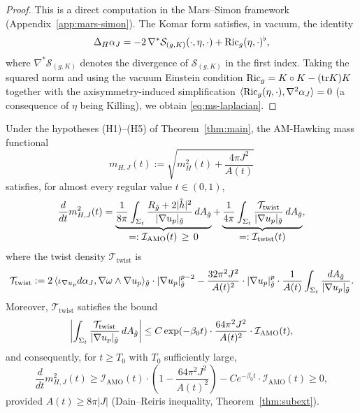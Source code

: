 \begin{proof}
This is a direct computation in the Mars--Simon framework (Appendix~\ref{app:mars-simon}). The Komar form satisfies, in vacuum, the identity
\begin{equation}
\Delta_H \alpha_J = -2\,\nabla^* \mathcal{S}_{(g,K)}(\cdot, \eta, \cdot) + \mathrm{Ric}_g(\eta, \cdot)^\flat,
\end{equation}
where $\nabla^* \mathcal{S}_{(g,K)}$ denotes the divergence of $\mathcal{S}_{(g,K)}$ in the first index. Taking the squared norm and using the vacuum Einstein condition $\mathrm{Ric}_g = K \circ K - (\mathrm{tr} K) K$ together with the axisymmetry-induced simplification $\langle \mathrm{Ric}_g(\eta, \cdot), \nabla^2 \alpha_J\rangle = 0$ (a consequence of $\eta$ being Killing), we obtain \eqref{eq:ms-laplacian}.
\end{proof}

\begin{theorem}\label{thm:tbm-main}
Under the hypotheses (H1)--(H5) of Theorem~\ref{thm:main}, the AM-Hawking mass functional
\begin{equation}
m_{H,J}(t) := \sqrt{m_H^2(t) + \frac{4\pi J^2}{A(t)}}
\end{equation}
satisfies, for almost every regular value $t \in (0, 1)$,
\begin{equation}\label{eq:tbm-formula}
\frac{d}{dt} m_{H,J}^2(t) = \underbrace{\frac{1}{8\pi}\int_{\Sigma_t} \frac{R_{\tilde{g}} + 2|\mathring{h}|^2}{|\nabla u_p|_{\tilde{g}}} \, dA_{\tilde{g}}}_{\displaystyle =: \mathcal{I}_{\mathrm{AMO}}(t) \,\geq\, 0} + \underbrace{\frac{1}{4\pi}\int_{\Sigma_t} \frac{\mathcal{T}_{\mathrm{twist}}}{|\nabla u_p|_{\tilde{g}}} \, dA_{\tilde{g}}}_{\displaystyle =: \mathcal{I}_{\mathrm{twist}}(t)},
\end{equation}
where the twist density $\mathcal{T}_{\mathrm{twist}}$ is
\begin{equation}
\mathcal{T}_{\mathrm{twist}} := 2\,\langle \iota_{\nabla u_p} d\alpha_J, \nabla \omega \wedge \nabla u_p \rangle_{\tilde{g}} \cdot |\nabla u_p|_{\tilde{g}}^{p-2} - \frac{32\pi^2 J^2}{A(t)^2} \cdot |\nabla u_p|_{\tilde{g}}^{p} \cdot \frac{1}{A(t)} \int_{\Sigma_t} \frac{dA_{\tilde{g}}}{|\nabla u_p|_{\tilde{g}}}.
\end{equation}
Moreover, $\mathcal{T}_{\mathrm{twist}}$ satisfies the bound
\begin{equation}\label{eq:twist-bound}
\left|\int_{\Sigma_t} \frac{\mathcal{T}_{\mathrm{twist}}}{|\nabla u_p|_{\tilde{g}}} \, dA_{\tilde{g}}\right| \leq C \exp(-\beta_0 t) \cdot \frac{64 \pi^2 J^2}{A(t)^2} \cdot \mathcal{I}_{\mathrm{AMO}}(t),
\end{equation}
and consequently, for $t \geq T_0$ with $T_0$ sufficiently large,
\begin{equation}\label{eq:tbm-monotone}
\frac{d}{dt} m_{H,J}^2(t) \geq \mathcal{I}_{\mathrm{AMO}}(t) \cdot \left(1 - \frac{64\pi^2 J^2}{A(t)^2}\right) - C e^{-\beta_0 t} \cdot \mathcal{I}_{\mathrm{AMO}}(t) \geq 0,
\end{equation}
provided $A(t) \geq 8\pi |J|$ (Dain--Reiris inequality, Theorem~\ref{thm:subext}).
\end{theorem}

